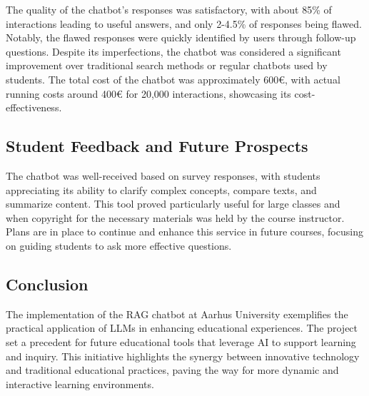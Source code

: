 The quality of the chatbot's responses was satisfactory, with about 85\% of interactions leading to useful answers, and only 2-4.5\% of responses being flawed. Notably, the flawed responses were quickly identified by users through follow-up questions. Despite its imperfections, the chatbot was considered a significant improvement over traditional search methods or regular chatbots used by students. The total cost of the chatbot was approximately 600€, with actual running costs around 400€ for 20,000 interactions, showcasing its cost-effectiveness.

\subsection*{Student Feedback and Future Prospects}

The chatbot was well-received based on survey responses, with students appreciating its ability to clarify complex concepts, compare texts, and summarize content. This tool proved particularly useful for large classes and when copyright for the necessary materials was held by the course instructor. Plans are in place to continue and enhance this service in future courses, focusing on guiding students to ask more effective questions.

\subsection*{Conclusion}

The implementation of the RAG chatbot at Aarhus University exemplifies the practical application of LLMs in enhancing educational experiences. The project set a precedent for future educational tools that leverage AI to support learning and inquiry. This initiative highlights the synergy between innovative technology and traditional educational practices, paving the way for more dynamic and interactive learning environments.